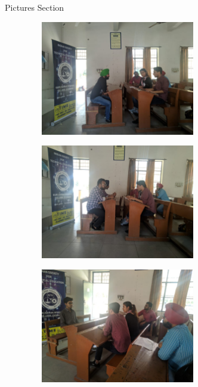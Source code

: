 \documentclass[12pt, a4 paper]{article}
\begin{document}
\begin{center}
\Huge Pictures Section

\medskip

\includegraphics[width=10cm,height=5cm]{image4.jpg}

\medskip
\includegraphics[width=10cm,height=5cm]{image6.jpg}

\medskip

\includegraphics[width=10cm,height=5cm]{image7.jpg}

\end{center}

\newpage
\end{document}
